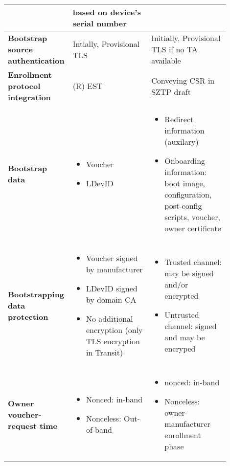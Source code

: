 \begin{longtable}{|p{0.2\linewidth}|p{0.35\linewidth}|p{0.35\linewidth}|}
		& based on device's serial number \\

		\hline
		\cellcolor[rgb]{ .745, .804, .843}\textbf{Bootstrap source authentication} & Intially, Provisional TLS & Initially, Provisional TLS if no TA available \\

		\hline
		\cellcolor[rgb]{ .745, .804, .843}\textbf{Enrollment protocol integration} & (R) EST & Conveying CSR in SZTP draft \cite{sztp-csr-draft} \\

		\hline
		\cellcolor[rgb]{ .745, .804, .843}\textbf{Bootstrap data} & 
		\begin{itemize}[leftmargin=*, topsep=0pt, noitemsep]
			\item
				Voucher
			\item
				LDevID
		\end{itemize}
		 & 
			\begin{itemize}[leftmargin=*, topsep=0pt, noitemsep]
			\item
			Redirect information (auxilary)
			\item
			Onboarding information: boot image, configuration, post-config scripts, voucher, owner certificate
		\end{itemize}
		 \\

		\hline
		\cellcolor[rgb]{ .745, .804, .843}\textbf{Bootstrapping data protection} & 
			\begin{itemize}[leftmargin=*, topsep=0pt, noitemsep]
			\item
			 Voucher signed by manufacturer
			\item
			 LDevID signed by domain CA
			\item
			 No additional encryption (only TLS encryption in Transit)
		\end{itemize}
		 	 & 
			\begin{itemize}[leftmargin=*, topsep=0pt, noitemsep]
			\item
			 Trusted channel: may be signed and/or encrypted
			\item
			 Untrusted channel: signed and may be encryped
		\end{itemize}
		 \\

		\hline
		\cellcolor[rgb]{ .745, .804, .843}\textbf{Owner voucher-request time} & 
		\begin{itemize}[leftmargin=*, topsep=0pt, noitemsep]
		\item
			Nonced: in-band
		\item
			Nonceless: Out-of-band
		\end{itemize}
		 & 
		\begin{itemize}[leftmargin=*, topsep=0pt, noitemsep]
		\item
			nonced: in-band
		\item
			Nonceless: owner-manufacturer enrollment phase
		\end{itemize}
	 \\


\end{longtable}
